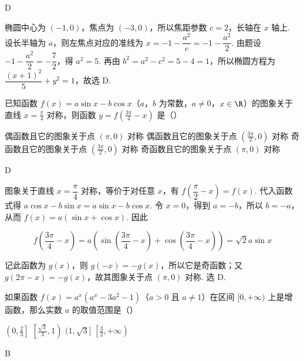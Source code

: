\begin{answer}
D
\end{answer}

\begin{solution}
椭圆中心为 \((-1,0)\)，焦点为 \((-3,0)\)，所以焦距参数 \(c=2\)，长轴在 \(x\) 轴上. 设长半轴为 \(a\)，则左焦点对应的准线为 \(x=-1-\dfrac{a^2}{c}=-1-\dfrac{a^2}{2}\). 由题设 \(-1-\dfrac{a^2}{2}=-\dfrac{7}{2}\)，得 \(a^2=5\). 再由 \(b^2=a^2-c^2=5-4=1\)，所以椭圆方程为 \(\dfrac{(x+1)^2}{5}+y^2=1\)，故选 D.
\end{solution}

\begin{problem}
已知函数 \(f(x) = a\sin x - b\cos x\)（\(a\)，\(b\) 为常数，\(a \neq 0\)，\(x \in \R\)）的图象关于直线 \(x = \frac{\pi}{4}\) 对称，则函数 \(y = f\left(\frac{3\pi}{4} - x\right)\) 是（\quad）

\choices
    {偶函数且它的图象关于点 \((\pi, 0)\) 对称}
    {偶函数且它的图象关于点 \(\left(\frac{3\pi}{2}, 0\right)\) 对称}
    {奇函数且它的图象关于点 \(\left(\frac{3\pi}{2}, 0\right)\) 对称}
    {奇函数且它的图象关于点 \((\pi, 0)\) 对称}
\end{problem}

\begin{answer}
D
\end{answer}

\begin{solution}
图象关于直线 \(x=\dfrac{\pi}{4}\) 对称，等价于对任意 \(x\)，有 \(f\left(\dfrac{\pi}{2}-x\right)=f(x)\). 代入函数式得 \(a\cos x-b\sin x=a\sin x-b\cos x\). 令 \(x=0\)，得到 \(a=-b\)，所以 \(b=-a\)，从而 \(f(x)=a(\sin x+\cos x)\). 因此

\[
f\left(\frac{3\pi}{4}-x\right)=a\left(\sin\left(\frac{3\pi}{4}-x\right)+\cos\left(\frac{3\pi}{4}-x\right)\right)=\sqrt{2}a\sin x
\]

记此函数为 \(g(x)\)，则 \(g(-x)=-g(x)\)，所以它是奇函数；又 \(g(2\pi-x)=-g(x)\)，故其图象关于点 \((\pi,0)\) 对称. 选 D.
\end{solution}

\begin{problem}
如果函数 \(f(x) = a^x(a^x - 3a^2 - 1)\)（\(a > 0\) 且 \(a \neq 1\)）在区间 \([0,+\infty)\) 上是增函数，那么实数 \(a\) 的取值范围是（\quad）

\choices
    {\(\left(0, \frac{2}{3}\right]\)}
    {\(\left[\frac{\sqrt{3}}{3}, 1\right)\)}
    {\((1, \sqrt{3}]\)}
    {\(\left[\frac{3}{2}, +\infty\right)\)}
\end{problem}

\begin{answer}
B
\end{answer}

